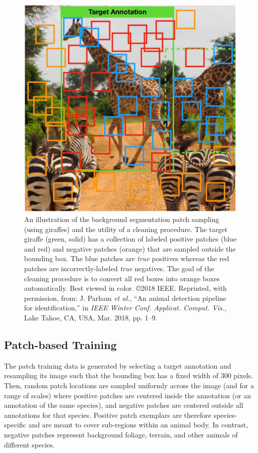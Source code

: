 \begin{figure}[!t]
    \begin{center}
        \includegraphics[width=0.7\linewidth]{resources/patches.pdf}
    \end{center}
    \caption{An illustration of the background segmentation patch sampling (using giraffes) and the utility of a cleaning procedure.  The target giraffe (green, solid) has a collection of labeled positive patches (blue and red) and negative patches (orange) that are sampled outside the bounding box.  The blue patches are \textit{true} positives whereas the red patches are incorrectly-labeled \textit{true} negatives.  The goal of the cleaning procedure is to convert all red boxes into orange boxes automatically.  Best viewed in color.  \copyright 2018 IEEE. Reprinted, with permission, from: J. Parham \textit{et al.}, ``An animal detection pipeline for identification,'' in \textit{IEEE Winter Conf. Applicat. Comput. Vis.}, Lake Tahoe, CA, USA, Mar. 2018, pp. 1–9.}
    \label{fig:patches}
\end{figure}

\subsection{Patch-based Training}

The patch training data is generated by selecting a target annotation and resampling its image such that the bounding box has a fixed width of 300 pixels.  Then, random patch locations are sampled uniformly across the image (and for a range of scales) where positive patches are centered inside the annotation (or an annotation of the same species), and negative patches are centered outside all annotations for that species.  Positive patch exemplars are therefore species-specific and are meant to cover sub-regions within an animal body. In contrast, negative patches represent background foliage, terrain, and other animals of different species.


